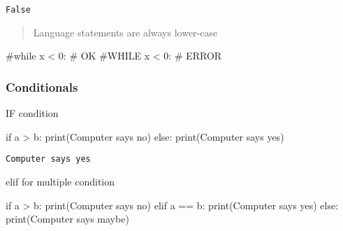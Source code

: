 \documentclass[
  letterpaper,
  DIV=11,
  numbers=noendperiod]{scrreprt}
\newenvironment{Shaded}{\begin{snugshade}}{\end{snugshade}}
\newcommand{\BuiltInTok}[1]{\textcolor[rgb]{0.00,0.46,0.62}{#1}}
\newcommand{\CommentTok}[1]{\textcolor[rgb]{0.37,0.37,0.37}{#1}}
\newcommand{\ControlFlowTok}[1]{\textcolor[rgb]{0.00,0.46,0.62}{#1}}
\newcommand{\NormalTok}[1]{\textcolor[rgb]{0.00,0.46,0.62}{#1}}
\newcommand{\OperatorTok}[1]{\textcolor[rgb]{0.37,0.37,0.37}{#1}}
\newcommand{\StringTok}[1]{\textcolor[rgb]{0.13,0.47,0.30}{#1}}
\begin{document}
\begin{verbatim}
False
\end{verbatim}

\begin{quote}
Language statements are always lower-case
\end{quote}

\begin{Shaded}
\begin{Highlighting}[]
\CommentTok{\#while x \textless{} 0:   \# OK}
\CommentTok{\#WHILE x \textless{} 0:   \# ERROR}
\end{Highlighting}
\end{Shaded}

\hypertarget{conditionals}{%
\subsubsection{Conditionals}\label{conditionals}}

IF condition

\begin{Shaded}
\begin{Highlighting}[]
\ControlFlowTok{if}\NormalTok{ a }\OperatorTok{\textgreater{}}\NormalTok{ b:}
    \BuiltInTok{print}\NormalTok{(}\StringTok{\textquotesingle{}Computer says no\textquotesingle{}}\NormalTok{)}
\ControlFlowTok{else}\NormalTok{:}
    \BuiltInTok{print}\NormalTok{(}\StringTok{\textquotesingle{}Computer says yes\textquotesingle{}}\NormalTok{)}
\end{Highlighting}
\end{Shaded}

\begin{verbatim}
Computer says yes
\end{verbatim}

elif for multiple condition

\begin{Shaded}
\begin{Highlighting}[]
\ControlFlowTok{if}\NormalTok{ a }\OperatorTok{\textgreater{}}\NormalTok{ b:}
    \BuiltInTok{print}\NormalTok{(}\StringTok{\textquotesingle{}Computer says no\textquotesingle{}}\NormalTok{)}
\ControlFlowTok{elif}\NormalTok{ a }\OperatorTok{==}\NormalTok{ b:}
    \BuiltInTok{print}\NormalTok{(}\StringTok{\textquotesingle{}Computer says yes\textquotesingle{}}\NormalTok{)}
\ControlFlowTok{else}\NormalTok{:}
    \BuiltInTok{print}\NormalTok{(}\StringTok{\textquotesingle{}Computer says maybe\textquotesingle{}}\NormalTok{)}
\end{Highlighting}
\end{Shaded}
\end{document}
